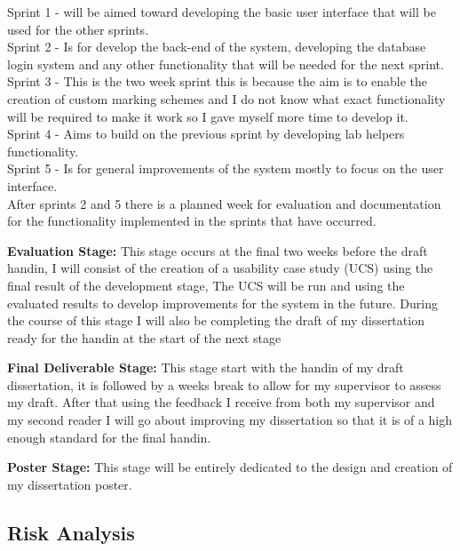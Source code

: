 \documentclass[12pt]{article}  %
\begin{document}
\noindent Sprint 1 - will be aimed toward developing the basic user interface that will be used for the other sprints.\\ 
Sprint 2 - Is for develop the back-end of the system, developing the database login system and any other functionality that will be needed for the next sprint.\\
Sprint 3 - This is the two week sprint this is because the aim is to enable the creation of custom marking schemes and I do not know what exact functionality will be required to make it work so I gave myself more time to develop it.\\
Sprint 4 - Aims to build on the previous sprint by developing lab helpers functionality.\\ 
Sprint 5 - Is for general improvements of the system mostly to focus on the user interface.\\
After sprints 2 and 5 there is a planned week for evaluation and documentation for the functionality implemented in the sprints that have occurred.\bigskip

\newpage
\noindent
\textbf{Evaluation Stage: } This stage occurs at the final two weeks before the draft handin, I will consist of the creation of a usability case study (UCS) using the final result of the development stage, The UCS will be run and using the evaluated results to develop improvements for the system in the future. During the course of this stage I will also be completing the draft of my dissertation ready for the handin at the start of the next stage\bigskip

\noindent
\textbf{Final Deliverable Stage:} This stage start with the handin of my draft dissertation, it is followed by a weeks break to allow for my supervisor to assess my draft. After that using the feedback I receive from both my supervisor and my second reader I will go about improving my dissertation so that it is of a high enough standard for the final handin.\bigskip

\noindent
\textbf{Poster Stage:} This stage will be entirely dedicated to the design and creation of my dissertation poster.






\newpage
\subsection{Risk Analysis}
\end{document}
